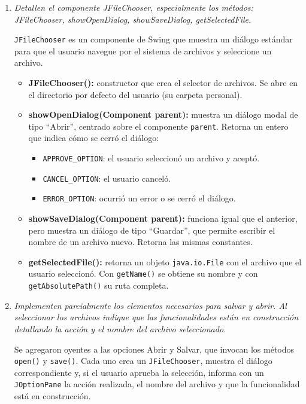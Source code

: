 \documentclass[12pt,letterpaper]{article}
\newcommand{\enunciado}[1]{\textit{#1}\par}
\begin{document}
\begin{enumerate}
  \item \enunciado{Detallen el componente JFileChooser, especialmente los métodos: JFileChooser, showOpenDialog, showSaveDialog, getSelectedFile.}

  \texttt{JFileChooser} es un componente de Swing que muestra un diálogo estándar para que el usuario navegue por el sistema de archivos y seleccione un archivo.
  \begin{itemize}
    \item \textbf{JFileChooser():} constructor que crea el selector de archivos. Se abre en el directorio por defecto del usuario (su carpeta personal).
    \item \textbf{showOpenDialog(Component parent):} muestra un diálogo modal de tipo ``Abrir'', centrado sobre el componente \texttt{parent}. Retorna un entero que indica cómo se cerró el diálogo:
    \begin{itemize}
      \item \texttt{APPROVE\_OPTION}: el usuario seleccionó un archivo y aceptó.
      \item \texttt{CANCEL\_OPTION}: el usuario canceló.
      \item \texttt{ERROR\_OPTION}: ocurrió un error o se cerró el diálogo.
    \end{itemize}
    \item \textbf{showSaveDialog(Component parent):} funciona igual que el anterior, pero muestra un diálogo de tipo ``Guardar'', que permite escribir el nombre de un archivo nuevo. Retorna las mismas constantes.
    \item \textbf{getSelectedFile():} retorna un objeto \texttt{java.io.File} con el archivo que el usuario seleccionó. Con \texttt{getName()} se obtiene su nombre y con \texttt{getAbsolutePath()} su ruta completa.
  \end{itemize}

  \item \enunciado{Implementen parcialmente los elementos necesarios para salvar y abrir. Al seleccionar los archivos indique que las funcionalidades están en construcción detallando la acción y el nombre del archivo seleccionado.}

  Se agregaron oyentes a las opciones Abrir y Salvar, que invocan los métodos \texttt{open()} y \texttt{save()}. Cada uno crea un \texttt{JFileChooser}, muestra el diálogo correspondiente y, si el usuario aprueba la selección, informa con un \texttt{JOptionPane} la acción realizada, el nombre del archivo y que la funcionalidad está en construcción.


\end{enumerate}
\end{document}

